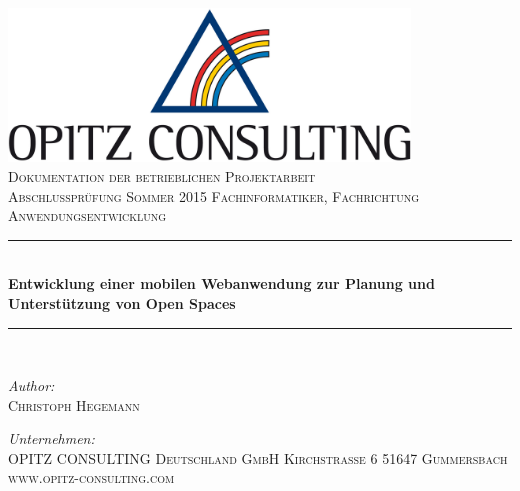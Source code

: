 \begin{titlepage}
\begin{center}

\includegraphics[width=0.80\textwidth]{img/oc-logo.jpg}\\[1cm]

\textsc{\LARGE Dokumentation der betrieblichen Projektarbeit}\\[1.5cm]

\textsc{\Large Abschlussprüfung Sommer 2015 Fachinformatiker, Fachrichtung Anwendungsentwicklung}\\[0.5cm]

\newcommand{\HRule}{\rule{\linewidth}{0.5mm}}
\HRule \\[0.4cm]
{ \huge \bfseries Entwicklung einer mobilen Webanwendung zur Planung und Unterstützung von Open Spaces}\\[0.4cm]
\HRule \\[1.5cm]

\begin{minipage}{0.3\textwidth}
\begin{flushleft} \large
\emph{Author:}\\
\textsc{Christoph Hegemann}
\end{flushleft}
\end{minipage}
\hfill
\begin{minipage}{0.5\textwidth}
\begin{flushright} \large
\emph{Unternehmen:} \\
\textsc{OPITZ CONSULTING Deutschland GmbH
Kirchstraße 6
51647 Gummersbach
www.opitz-consulting.com}
\end{flushright}
\end{minipage}

\vfill
\end{center}
\end{titlepage}
